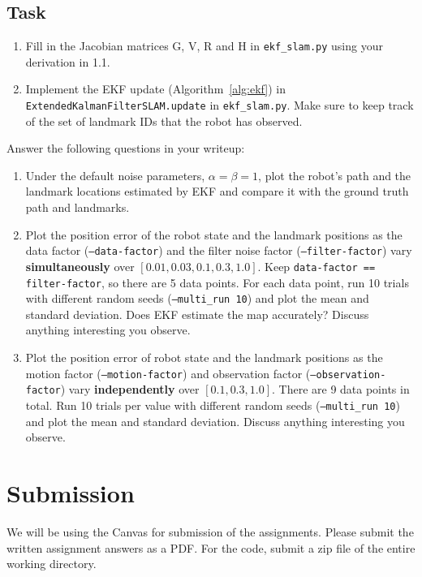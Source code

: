 \documentclass[tp]{lcc}
\begin{document}
\subsection*{Task}
\begin{enumerate}
    \item Fill in the Jacobian matrices G, V, R and H in \texttt{ekf\_slam.py} using your derivation in 1.1.
    \item Implement the EKF update (Algorithm~\ref{alg:ekf}) in \texttt{ExtendedKalmanFilterSLAM.update} in \texttt{ekf\_slam.py}. Make sure to keep track of the set of landmark IDs that the robot has observed.
\end{enumerate}

Answer the following questions in your writeup:
\begin{enumerate}
    \item Under the default noise parameters, $\alpha=\beta=1$, plot the robot's path and the landmark locations estimated by EKF and compare it with the ground truth path and landmarks.
    \item Plot the position error of the robot state and the landmark positions as the data factor (\texttt{--data-factor}) and the filter noise factor (\texttt{--filter-factor}) vary \textbf{simultaneously} over $[0.01,0.03,0.1,0.3,1.0]$. Keep \texttt{data-factor == filter-factor}, so there are 5 data points. For each data point, run 10 trials with different random seeds (\texttt{--multi\_run 10}) and plot the mean and standard deviation. Does EKF estimate the map accurately? Discuss anything interesting you observe.
    \item Plot the position error of robot state and the landmark positions as the motion factor (\texttt{--motion-factor}) and observation factor (\texttt{--observation-factor}) vary \textbf{independently} over $[0.1,0.3,1.0]$. There are 9 data points in total. Run 10 trials per value with different random seeds (\texttt{--multi\_run 10}) and plot the mean and standard deviation. Discuss anything interesting you observe.
\end{enumerate}

\section{Submission}
We will be using the Canvas for submission of the assignments. Please submit the written assignment answers as a PDF. For the code, submit a zip file of the entire working directory.

\printbibliography
\end{document}

